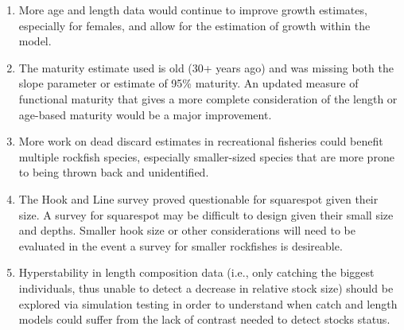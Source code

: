 \documentclass[11pt,
  english,
  a4paper,
]{article}
\begin{document}
\leavevmode\tagmcend\tagstructend\par


\begin{enumerate}
\def\labelenumi{\arabic{enumi}.}
\item

  More age and length data would continue to improve growth estimates, especially for females, and allow for the estimation of growth within the model.

  \tagmcend\tagstructend\tagstructend
\item

  The maturity estimate used is old (30+ years ago) and was missing both the slope parameter or estimate of 95\% maturity. An updated measure of functional maturity that gives a more complete consideration of the length or age-based maturity would be a major improvement.

  \tagmcend\tagstructend\tagstructend
\item

  More work on dead discard estimates in recreational fisheries could benefit multiple rockfish species, especially smaller-sized species that are more prone to being thrown back and unidentified.

  \tagmcend\tagstructend\tagstructend
\item

  The Hook and Line survey proved questionable for squarespot given their size. A survey for squarespot may be difficult to design given their small size and depths. Smaller hook size or other considerations will need to be evaluated in the event a survey for smaller rockfishes is desireable.

  \tagmcend\tagstructend\tagstructend
\item

  Hyperstability in length composition data (i.e., only catching the biggest individuals, thus unable to detect a decrease in relative stock size) should be explored via simulation testing in order to understand when catch and length models could suffer from the lack of contrast needed to detect stocks status.

  \tagmcend\tagstructend\tagstructend
\end{enumerate}
\end{document}
